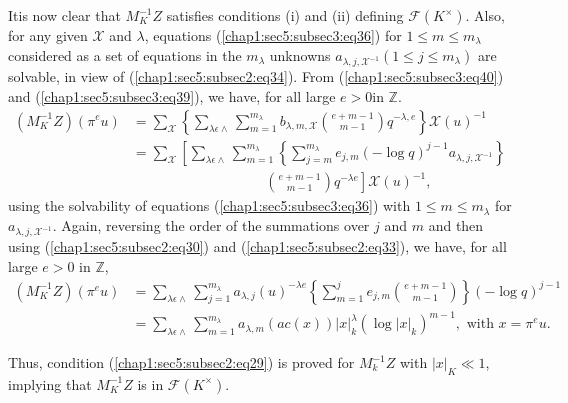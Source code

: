  It\pageoriginale is now clear that ${M_{K}^{-1}}Z$ satisfies conditions (i) and (ii)
 defining $\mathscr{F}(K^\times)$. Also, for any given $\mathcal{X}$
 and $\lambda$, equations (\ref{chap1:sec5:subsec3:eq36}) for $1\le
 m\le m_{\lambda}$ considered 
 as a set of equations in the $m_{\lambda}$ unknowns $a_{\lambda, j,
   \mathcal{X}^{-1}}(1\le j\le m_{\lambda})$ are solvable, in view of
 (\ref{chap1:sec5:subsec2:eq34}). From
 (\ref{chap1:sec5:subsec3:eq40}) and (\ref{chap1:sec5:subsec3:eq39}),
 we have, for all large $e>0$in $\mathbb{Z}$.  
\begin{align*}
  (M_{K}^{-1}Z)(\pi^{e}u)& =\sum\limits_{\mathcal{X}}
  \left\{\sum\limits_{\lambda \epsilon
    \wedge}\sum\limits_{m=1}^{m_{\lambda}} b_{\lambda,m,\mathcal{X}}
  \binom{e+m-1}{m-1} q^{-\lambda,e}\right\}\mathcal{X}(u)^{-1}\\
   & =\sum\limits_{\mathcal{X}} \left[ \sum\limits_{\lambda\epsilon
    \wedge}\sum\limits_{m=1}^{m_{\lambda}} \left\{
    \sum\limits_{j=m}^{m_{\lambda}} e_{j,m}(-\log q)^{j-1}a_{\lambda,
    j,\mathcal{X}^{-1}}\right\} \right.\\
   & \hspace{4cm} \left. {\binom{e+m-1}{m-1}} q^{-\lambda
      e}\right]\mathcal{X}(u)^{-1}, 
\end{align*}
using the solvability of equations (\ref{chap1:sec5:subsec3:eq36})
with $1\le m\le m_{\lambda}$ 
for $a_{\lambda,j,\mathcal{X}^{-1}}$. Again, reversing the order of
the summations over $j$ and $m$ and then using
(\ref{chap1:sec5:subsec2:eq30}) and (\ref{chap1:sec5:subsec2:eq33}), we 
have, for all large $e>0$ in $\mathbb{Z}$,  
\begin{align*}
  (M_{K}^{-1}Z)(\pi^{e}u)& =\sum_{\lambda \epsilon \wedge}
  \sum_{j=1}^{m_{\lambda}} a_{\lambda, j}(u)^{-\lambda e}
  \left\{\sum_{m=1}^{j}e_{j,m} \binom{e+m-1}{m-1}\right\} (-\log q)^{j-1}\\
  & =\sum_{\lambda \epsilon \wedge}\sum_{m=1}^{m_{\lambda}}
  a_{\lambda,m} (ac(x))|x|_{k}^{\lambda}(\log |x|_{k})^{m-1}, 
  \text{ with }  x=\pi^{e}u. 
\end{align*}

Thus, condition (\ref{chap1:sec5:subsec2:eq29}) is proved for $M_{k}^{-1} Z$ with $|x|_{K}\ll 1$,
implying that $M_{K}^{-1}Z$ is in $\mathscr{F}(K^\times )$.  

